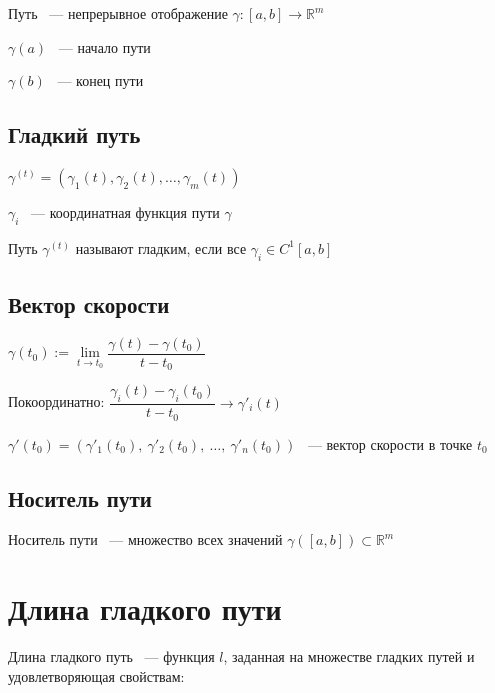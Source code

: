 \documentclass{article}
\begin{document}
        Путь ~--- непрерывное отображение $\gamma : [a, b] \rightarrow \mathbb{R}^m$
        
        $\gamma(a)$ ~--- начало пути
        
        $\gamma(b)$ ~--- конец пути
        
        \subsection{Гладкий путь}
        
            $ \gamma^{(t)} = \left( \gamma_1(t), \gamma_2(t), \ldots, \gamma_m(t) \right)$
        
            $\gamma_i$ ~--- координатная функция пути $\gamma$
        
            Путь $\gamma^{(t)}$ называют гладким, если все $\gamma_i \in C^1 [a, b]$
        
        \subsection{Вектор скорости}
        
            $\gamma(t_0) := \lim\limits_{t \rightarrow t_0} \dfrac{\gamma(t) - \gamma(t_0)}{t - t_0}$
            
            Покоординатно: $\dfrac{\gamma_i(t) - \gamma_i(t_0)}{t - t_0} \rightarrow \gamma'_i(t)$
        
            $\gamma'(t_0) = \left( \gamma'_1(t_0), \ \gamma'_2(t_0), \ \ldots, \ \gamma'_n(t_0) \right)$ ~--- вектор скорости в точке $t_0$
        
        \subsection{Носитель пути}
        
            Носитель пути ~--- множество всех значений $\gamma([a, b]) \subset \mathbb{R}^m$
        
    \newpage
    
    \section{Длина гладкого пути}
    
        Длина гладкого путь ~--- функция $l$, заданная на множестве гладких путей и удовлетворяющая свойствам:
        
\end{document}
